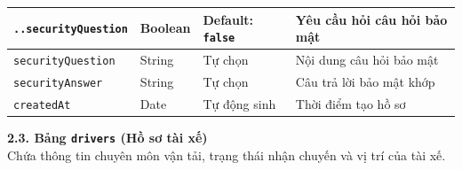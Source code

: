 \documentclass[../DoAn.tex]{subfiles}
\begin{document}
\begin{table}[H]
\begin{tabular}{|l|l|p{4cm}|p{5cm}|}
        \texttt{..securityQuestion} & Boolean       & Default: \texttt{false}             & Yêu cầu hỏi câu hỏi bảo mật \\ \hline
        \texttt{securityQuestion}   & String        & Tự chọn                             & Nội dung câu hỏi bảo mật    \\ \hline
        \texttt{securityAnswer}     & String        & Tự chọn                             & Câu trả lời bảo mật khớp    \\ \hline
        \texttt{createdAt}          & Date          & Tự động sinh                        & Thời điểm tạo hồ sơ         \\ \hline
    \end{tabular}
\end{table}

\newpage
\textbf{2.3. Bảng \texttt{drivers} (Hồ sơ tài xế)} \\
Chứa thông tin chuyên môn vận tải, trạng thái nhận chuyến và vị trí của tài xế.
\end{document}
